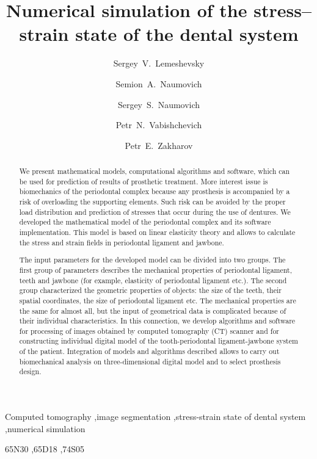 \documentclass{elsarticle}
\begin{document}
\begin{frontmatter}

\title{Numerical simulation of the stress–strain state of the
dental system}

\author[im]{Sergey~V.~Lemeshevsky}

\author[bu]{Semion~A.~Naumovich}

\author[bu]{Sergey~S.~Naumovich}

\author[nsi,univ]{Petr~N.~Vabishchevich}

\author[univ]{Petr~E.~Zakharov}

\address[im]{Institute of Mathematics, National Academy of Sciences, Minsk, Belarus}
\address[bu]{Belarusian State Medical University, Minsk, Belarus}
\address[nsi]{Nuclear Safety Institute, Russian Academy of Sciences, Moscow, Russia}
\address[univ]{North-Eastern Federal University,  Yakutsk, Russia}


\begin{abstract}
We present mathematical models, computational algorithms and software,
which can be used for prediction of results of prosthetic
treatment. More interest issue is biomechanics of the periodontal
complex because any prosthesis is accompanied by a risk of overloading
the supporting elements. Such risk can be avoided by the proper load
distribution and prediction of stresses that occur during the use of
dentures. We developed the mathematical model of the periodontal
complex and its software implementation. This model is based on linear
elasticity theory and allows to calculate the stress and
strain fields in periodontal ligament and jawbone.

The input parameters for the developed model can be divided into two
groups. The first group of parameters describes the mechanical
properties of periodontal ligament, teeth and jawbone (for example, elasticity of
periodontal ligament etc.). The second group characterized the
geometric properties of objects: the size of the teeth, their spatial
coordinates, the size of periodontal ligament etc.
The mechanical properties are the same for almost all, but the input
of geometrical data is complicated because of their individual
characteristics. In this connection, we develop algorithms and
software for processing of images obtained by computed tomography (CT) scanner
and for constructing individual digital model of the
tooth-periodontal ligament-jawbone system of the patient.
Integration of models and algorithms described allows to carry out
biomechanical analysis on three-dimensional digital model and to
select prosthesis design.
\end{abstract}

\begin{keyword}
Computed tomography \sep image segmentation \sep stress-strain state of dental
system \sep numerical simulation

\MSC[2010] 65N30  \sep 65D18 \sep 74S05
\end{keyword}

\end{frontmatter}
\end{document}
